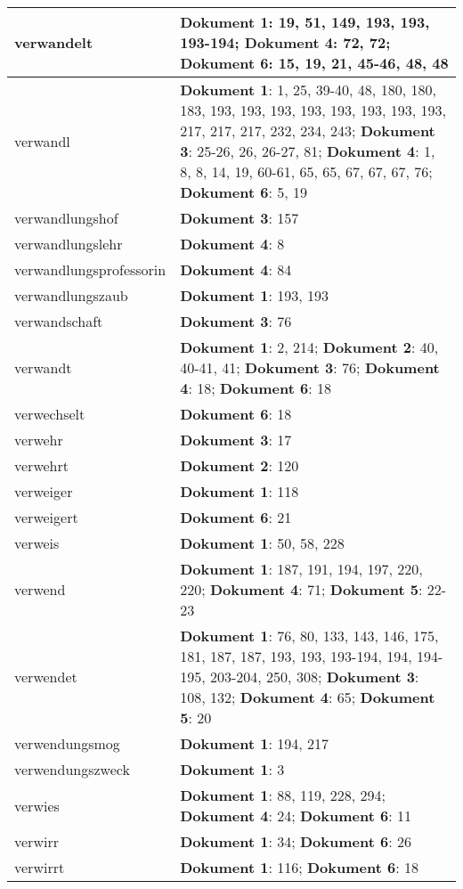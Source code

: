 \documentclass[a5paper]{article}
\begin{document}
\begin{longtable}[l]{|l|p{3in}|}
\hline
verwandelt & \textbf{Dokument 1}: 19, 51, 149, 193, 193, 193-194; \textbf{Dokument 4}: 72, 72; \textbf{Dokument 6}: 15, 19, 21, 45-46, 48, 48 \\
\hline
verwandl & \textbf{Dokument 1}: 1, 25, 39-40, 48, 180, 180, 183, 193, 193, 193, 193, 193, 193, 193, 193, 217, 217, 217, 232, 234, 243; \textbf{Dokument 3}: 25-26, 26, 26-27, 81; \textbf{Dokument 4}: 1, 8, 8, 14, 19, 60-61, 65, 65, 67, 67, 67, 76; \textbf{Dokument 6}: 5, 19 \\
\hline
verwandlungshof & \textbf{Dokument 3}: 157 \\
\hline
verwandlungslehr & \textbf{Dokument 4}: 8 \\
\hline
verwandlungsprofessorin & \textbf{Dokument 4}: 84 \\
\hline
verwandlungszaub & \textbf{Dokument 1}: 193, 193 \\
\hline
verwandschaft & \textbf{Dokument 3}: 76 \\
\hline
verwandt & \textbf{Dokument 1}: 2, 214; \textbf{Dokument 2}: 40, 40-41, 41; \textbf{Dokument 3}: 76; \textbf{Dokument 4}: 18; \textbf{Dokument 6}: 18 \\
\hline
verwechselt & \textbf{Dokument 6}: 18 \\
\hline
verwehr & \textbf{Dokument 3}: 17 \\
\hline
verwehrt & \textbf{Dokument 2}: 120 \\
\hline
verweiger & \textbf{Dokument 1}: 118 \\
\hline
verweigert & \textbf{Dokument 6}: 21 \\
\hline
verweis & \textbf{Dokument 1}: 50, 58, 228 \\
\hline
verwend & \textbf{Dokument 1}: 187, 191, 194, 197, 220, 220; \textbf{Dokument 4}: 71; \textbf{Dokument 5}: 22-23 \\
\hline
verwendet & \textbf{Dokument 1}: 76, 80, 133, 143, 146, 175, 181, 187, 187, 193, 193, 193-194, 194, 194-195, 203-204, 250, 308; \textbf{Dokument 3}: 108, 132; \textbf{Dokument 4}: 65; \textbf{Dokument 5}: 20 \\
\hline
verwendungsmog & \textbf{Dokument 1}: 194, 217 \\
\hline
verwendungszweck & \textbf{Dokument 1}: 3 \\
\hline
verwies & \textbf{Dokument 1}: 88, 119, 228, 294; \textbf{Dokument 4}: 24; \textbf{Dokument 6}: 11 \\
\hline
verwirr & \textbf{Dokument 1}: 34; \textbf{Dokument 6}: 26 \\
\hline
verwirrt & \textbf{Dokument 1}: 116; \textbf{Dokument 6}: 18 \\

\end{longtable}
\end{document}
